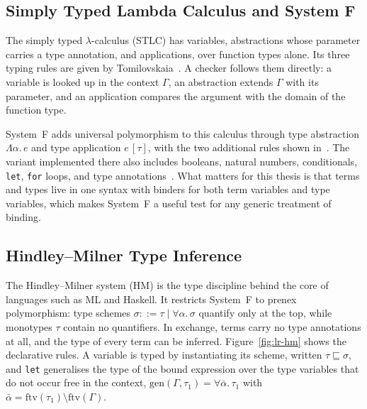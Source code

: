 \subsection{Simply Typed Lambda Calculus and System F}

The simply typed $\lambda$-calculus (STLC) has variables, abstractions whose parameter carries a type annotation, and applications, over function types alone. Its three typing rules are given by Tomilovskaia~\cite[Fig.~2.2]{tomilovskaia2025bidir}. A checker follows them directly: a variable is looked up in the context $\Gamma$, an abstraction extends $\Gamma$ with its parameter, and an application compares the argument with the domain of the function type.

System~F adds universal polymorphism to this calculus through type abstraction $\Lambda\alpha.\, e$ and type application $e\,[\tau]$, with the two additional rules shown in~\cite[Fig.~2.4]{tomilovskaia2025bidir}. The variant implemented there also includes booleans, natural numbers, conditionals, \texttt{let}, \texttt{for} loops, and type annotations~\cite[Figs.~2.5 and~2.6]{tomilovskaia2025bidir}. What matters for this thesis is that terms and types live in one syntax with binders for both term variables and type variables, which makes System~F a useful test for any generic treatment of binding.

\subsection{Hindley--Milner Type Inference}

The Hindley--Milner system (HM) is the type discipline behind the core of languages such as ML and Haskell. It restricts System~F to prenex polymorphism: type schemes $\sigma ::= \tau \mid \forall\alpha.\, \sigma$ quantify only at the top, while monotypes $\tau$ contain no quantifiers. In exchange, terms carry no type annotations at all, and the type of every term can be inferred. Figure~\ref{fig:lr-hm} shows the declarative rules. A variable is typed by instantiating its scheme, written $\tau \sqsubseteq \sigma$, and \texttt{let} generalises the type of the bound expression over the type variables that do not occur free in the context, $\mathrm{gen}(\Gamma, \tau_1) = \forall\bar\alpha.\, \tau_1$ with $\bar\alpha = \mathrm{ftv}(\tau_1) \setminus \mathrm{ftv}(\Gamma)$.

